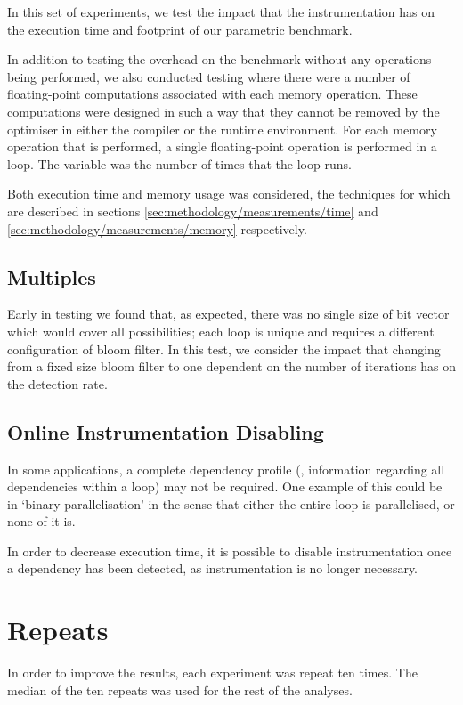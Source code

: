 	In this set of experiments, we test the impact that the instrumentation has on the execution time and footprint of our parametric benchmark.
	
	In addition to testing the overhead on the benchmark without any operations being performed, we also conducted testing where there were a number of floating-point computations associated with each memory operation. These computations were designed in such a way that they cannot be removed by the optimiser in either the compiler or the runtime environment. For each memory operation that is performed, a single floating-point operation is performed in a loop. The variable was the number of times that the loop runs.
	
	Both execution time and memory usage was considered, the techniques for which are described in sections \ref{sec:methodology/measurements/time} and \ref{sec:methodology/measurements/memory} respectively. 
		
	\subsection{Multiples} \label{sec:methodology/experiments/multiples}
	Early in testing we found that, as expected, there was no single size of bit vector which would cover all possibilities; each loop is unique and requires a different configuration of bloom filter. In this test, we consider the impact that changing from a fixed size bloom filter to one dependent on the number of iterations has on the detection rate.
	
	\subsection{Online Instrumentation Disabling} \label{sec:methodology/experiments/online-disable}
	In some applications, a complete dependency profile (\ie, information regarding all dependencies within a loop) may not be required. One example of this could be in `binary parallelisation' in the sense that either the entire loop is parallelised, or none of it is.
	
	In order to decrease execution time, it is possible to disable instrumentation once a dependency has been detected, as instrumentation is no longer necessary. 

\section{Repeats} \label{sec:methodology/repeats}
In order to improve the results, each experiment was repeat ten times. The median of the ten repeats was used for the rest of the analyses.
	
